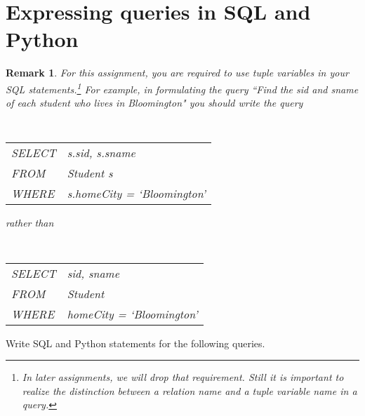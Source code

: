 \documentclass{article}
\newtheorem{remark}{Remark}
\begin{document}
  \section{Expressing queries in SQL and Python}\label{SQLQueries}

\begin{remark}
For this assignment,  you are required to 
use  tuple variables in your SQL statements.\footnote{In later assignments, we will drop that requirement.  Still it is important to realize the distinction between a relation name and a tuple variable name in a query.}    
For example, in formulating the query ``Find the sid and sname of each student who lives in Bloomington" you should write the query

\begin{center}{\tt
\begin{tabular}{ll}
SELECT &s.sid, s.sname\\
FROM & Student s\\
WHERE & s.homeCity = `Bloomington'
\end{tabular}}
\end{center}
rather than
\begin{center}{\tt
\begin{tabular}{ll}
SELECT &sid, sname\\
FROM & Student\\
WHERE & homeCity = `Bloomington' 
\end{tabular}}
\end{center}
\end{remark}

Write SQL and Python statements for the following queries.   
\end{document}
